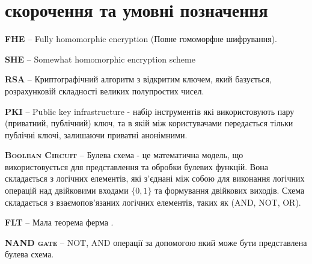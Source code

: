 \newpage
\chapter*{скорочення та умовні позначення}

\textbf{\textsc{FHE}} -- Fully homomorphic encryption (Повне гомоморфне шифрування).

\textbf{\textsc{SHE}} -- Somewhat homomorphic encryption scheme

\textbf{\textsc{RSA}} -- Криптографічний алгоритм з відкритим ключем, який базується,
розрахунковій складності великих полупростих чисел.

\textbf{\textsc{PKI}} -- Public key infrastructure - набір інструментів які
використовують пару (приватний, публічний) ключ, та в якій між користувачами
передається тільки публічні ключі, залишаючи приватні анонімними.

\textbf{\textsc{Boolean Circuit}} -- Булева схема - це математична модель, що
використовується для представлення та обробки булевих функцій. Вона складається з логічних
елементів, які з'єднані між собою для виконання логічних операцій над двійковими входами
\(\{0,1\}\) та формування двійкових виходів. Схема складається з взаємопов'язаних логічних
елементів, таких як (AND, NOT, OR). 

\textbf{\textsc{FLT}} -- Мала теорема ферма \cite{Fermat}.

\textbf{\textsc{NAND gate}} -- NOT, AND операції за допомогою який може бути представлена
булева схема.

